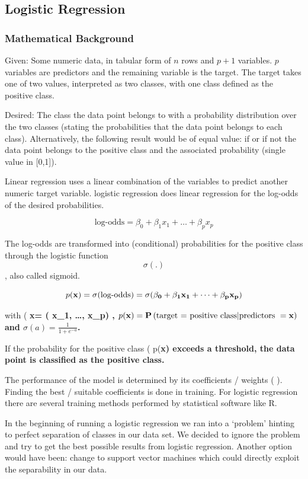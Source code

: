 \documentclass[]{article}
\begin{document}
\subsection{Logistic Regression}\label{logistic-regression}

\subsubsection{Mathematical Background}\label{mathematical-background}

Given: Some numeric data, in tabular form of \(n\) rows and \(p+1\)
variables. \(p\) variables are predictors and the remaining variable is
the target. The target takes one of two values, interpreted as two
classes, with one class defined as the positive class.

Desired: The class the data point belongs to with a probability
distribution over the two classes (stating the probabilities that the
data point belongs to each class). Alternatively, the following result
would be of equal value: if or if not the data point belongs to the
positive class and the associated probability (single value in
{[}0,1{]}).

Linear regression uses a linear combination of the variables to predict
another numeric target variable. logistic regression does linear
regression for the log-odds of the desired probabilities.

\[
\text{log-odds} = \beta_0 + \beta_1 x_1 + \dots + \beta_p x_p     
\]

The log-odds are transformed into (conditional) probabilities for the
positive class through the logistic function \[\sigma(.)\], also called
sigmoid.

\[
p(\bf{x}) = \sigma(\text{log-odds}) = \sigma(\beta_0 + \beta_1 x_1 + \dots + \beta_p x_p ) 
\]

with (
\bf{x}= ( x_1, \dots, x_p) \) , \( p(\bf{x}) = \mathbf{P}\left(\text{target = positive class} | \text{predictors } = \bf{x} \right) \) and  \( \sigma(a) = \frac{1}{1+e^{-a}} \).

If the probability for the positive class (
p(\bf{x}) \)  exceeds a threshold, the data point is classified as the positive class.

The performance of the model is determined by its coefficients / weights
( \beta ). Finding the best / suitable coefficients is done in training.
For logistic regression there are several training methods performed by
statistical software like R.

In the beginning of running a logistic regression we ran into a
`problem' hinting to perfect separation of classes in our data set. We
decided to ignore the problem and try to get the best possible results
from logistic regression. Another option would have been: change to
support vector machines which could directly exploit the separability in
our data.
\end{document}
